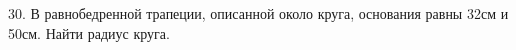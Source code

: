 30. В равнобедренной трапеции, описанной  около круга, основания равны 32см и 50см. Найти радиус круга.\\
